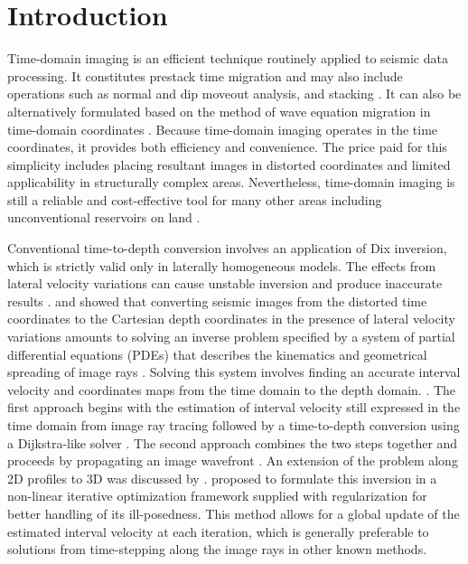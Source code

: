 \section{Introduction}
Time-domain imaging is an efficient technique routinely applied to seismic data processing. It constitutes prestack time migration and may also include operations such as normal and dip moveout analysis, and stacking \cite[]{yilmaz}. It can also be alternatively formulated based on the method of wave equation migration in time-domain coordinates \cite[]{fomelwaveeqtime}. Because time-domain imaging operates in the time coordinates, it provides both efficiency and convenience. The price paid for this simplicity includes placing resultant images in distorted coordinates and limited applicability in structurally complex areas. Nevertheless, time-domain imaging is still a reliable and cost-effective tool for many other areas including unconventional reservoirs on land \cite[]{fomelrecenttime}.

Conventional time-to-depth conversion involves an application of Dix inversion, which is strictly valid only in laterally homogeneous models. The effects from lateral velocity variations can cause unstable inversion and produce inaccurate results \cite[]{lynnclaerbout,black,plume,blias2009stacking,zonebeyond1d}. \cite{cam2007} and \cite{cam2008} showed that converting seismic images from the distorted time coordinates to the Cartesian depth coordinates in the presence of lateral velocity variations amounts to solving an inverse problem specified by a system of partial differential equations (PDEs) that describes the kinematics and geometrical spreading of image rays \cite[]{hubralimageray}. Solving this system involves finding an accurate interval velocity and coordinates maps from the time domain to the depth domain. . The first approach begins with the estimation of interval velocity still expressed in the time domain from image ray tracing followed by a time-to-depth conversion using a Dijkstra-like solver \cite[]{cam2007,cam2008,cam2009}. The second approach combines the two steps together and proceeds by propagating an image wavefront \cite[]{cam2007,valente}. An extension of the problem along 2D profiles to 3D was discussed by \cite{iversentygel}.  \cite{siweit2d} proposed to formulate this inversion in a non-linear iterative optimization framework supplied with regularization for better handling of its ill-posedness. This method allows for a global update of the estimated interval velocity at each iteration, which is generally preferable to solutions from time-stepping along the image rays in other known methods.

